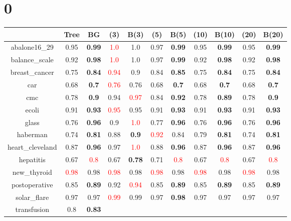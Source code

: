 \documentclass{article}%
\begin{document}
%
\normalsize%
\section*{0}%
\begin{tabular}{c|cccccccccc}%
\hline%
&Tree&BG&(3)&B(3)&(5)&B(5)&(10)&B(10)&(20)&B(20)\\%
\hline%
abalone16\_29&0.95&\textbf{0.99}&\textcolor{red}{ 
1.0
}&1.0&0.97&\textbf{0.99}&0.95&\textbf{0.99}&0.95&\textbf{0.99}\\%
\hline%
balance\_scale&0.92&\textbf{0.98}&\textcolor{red}{ 
1.0
}&1.0&0.97&\textbf{0.99}&0.92&\textbf{0.98}&0.92&\textbf{0.98}\\%
\hline%
breast\_cancer&0.75&\textbf{0.84}&\textcolor{red}{ 
0.94
}&0.9&0.84&\textbf{0.85}&0.75&\textbf{0.84}&0.75&\textbf{0.84}\\%
\hline%
car&0.68&\textbf{0.7}&\textcolor{red}{ 
0.76
}&0.76&0.68&\textbf{0.7}&0.68&\textbf{0.7}&0.68&\textbf{0.7}\\%
\hline%
cmc&0.78&\textbf{0.9}&0.94&\textcolor{red}{ 
0.97
}&0.84&\textbf{0.92}&0.78&\textbf{0.89}&0.78&\textbf{0.9}\\%
\hline%
ecoli&0.91&\textbf{0.93}&\textcolor{red}{ 
0.95
}&0.95&0.91&\textbf{0.93}&0.91&\textbf{0.93}&0.91&\textbf{0.93}\\%
\hline%
glass&0.76&\textbf{0.96}&0.9&\textcolor{red}{ 
1.0
}&0.77&\textbf{0.96}&0.76&\textbf{0.96}&0.76&\textbf{0.96}\\%
\hline%
haberman&0.74&\textbf{0.81}&0.88&\textbf{0.9}&\textcolor{red}{ 
0.92
}&0.84&0.79&\textbf{0.81}&0.74&\textbf{0.81}\\%
\hline%
heart\_cleveland&0.87&\textbf{0.96}&0.97&\textcolor{red}{ 
1.0
}&0.88&\textbf{0.96}&0.87&\textbf{0.96}&0.87&\textbf{0.96}\\%
\hline%
hepatitis&0.67&\textcolor{red}{ 
0.8
}&0.67&\textbf{0.78}&0.71&\textcolor{red}{ 
0.8
}&0.67&\textcolor{red}{ 
0.8
}&0.67&\textcolor{red}{ 
0.8
}\\%
\hline%
new\_thyroid&\textcolor{red}{ 
0.98
}&0.98&\textcolor{red}{ 
0.98
}&0.98&\textcolor{red}{ 
0.98
}&0.98&\textcolor{red}{ 
0.98
}&0.98&\textcolor{red}{ 
0.98
}&0.98\\%
\hline%
postoperative&0.85&\textbf{0.89}&0.92&\textcolor{red}{ 
0.94
}&0.85&\textbf{0.89}&0.85&\textbf{0.89}&0.85&\textbf{0.89}\\%
\hline%
solar\_flare&0.97&0.97&\textcolor{red}{ 
0.99
}&0.99&0.97&\textbf{0.98}&0.97&0.97&0.97&0.97\\%
\hline%
transfusion&0.8&\textbf{0.83}&\textcolor{red}{ 
}
\end{tabular}
\end{document}
